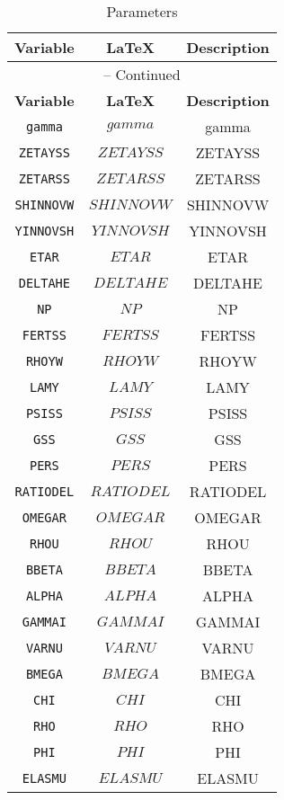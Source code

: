 \begin{center}
\begin{longtable}{ccc}
\caption{Parameters}\\%
\hline%
\multicolumn{1}{c}{\textbf{Variable}} &
\multicolumn{1}{c}{\textbf{\LaTeX}} &
\multicolumn{1}{c}{\textbf{Description}}\\%
\hline\hline%
\endfirsthead
\multicolumn{3}{c}{{\tablename} \thetable{} -- Continued}\\%
\hline%
\multicolumn{1}{c}{\textbf{Variable}} &
\multicolumn{1}{c}{\textbf{\LaTeX}} &
\multicolumn{1}{c}{\textbf{Description}}\\%
\hline\hline%
\endhead
\texttt{gamma} & $gamma$ & gamma\\
\texttt{ZETAYSS} & $ZETAYSS$ & ZETAYSS\\
\texttt{ZETARSS} & $ZETARSS$ & ZETARSS\\
\texttt{SHINNOVW} & $SHINNOVW$ & SHINNOVW\\
\texttt{YINNOVSH} & $YINNOVSH$ & YINNOVSH\\
\texttt{ETAR} & $ETAR$ & ETAR\\
\texttt{DELTAHE} & $DELTAHE$ & DELTAHE\\
\texttt{NP} & $NP$ & NP\\
\texttt{FERTSS} & $FERTSS$ & FERTSS\\
\texttt{RHOYW} & $RHOYW$ & RHOYW\\
\texttt{LAMY} & $LAMY$ & LAMY\\
\texttt{PSISS} & $PSISS$ & PSISS\\
\texttt{GSS} & $GSS$ & GSS\\
\texttt{PERS} & $PERS$ & PERS\\
\texttt{RATIODEL} & $RATIODEL$ & RATIODEL\\
\texttt{OMEGAR} & $OMEGAR$ & OMEGAR\\
\texttt{RHOU} & $RHOU$ & RHOU\\
\texttt{BBETA} & $BBETA$ & BBETA\\
\texttt{ALPHA} & $ALPHA$ & ALPHA\\
\texttt{GAMMAI} & $GAMMAI$ & GAMMAI\\
\texttt{VARNU} & $VARNU$ & VARNU\\
\texttt{BMEGA} & $BMEGA$ & BMEGA\\
\texttt{CHI} & $CHI$ & CHI\\
\texttt{RHO} & $RHO$ & RHO\\
\texttt{PHI} & $PHI$ & PHI\\
\texttt{ELASMU} & $ELASMU$ & ELASMU\\

\end{longtable}
\end{center}
